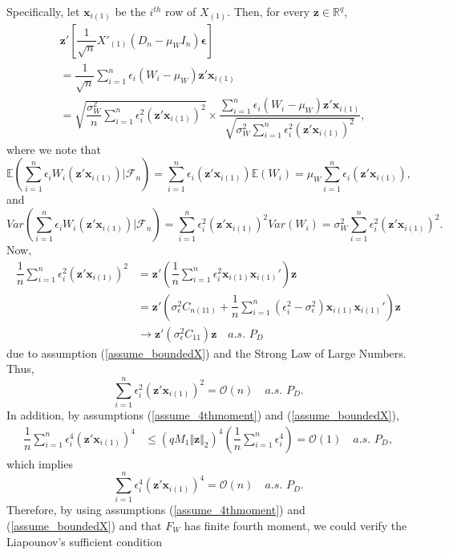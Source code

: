 \documentclass[ejs,authoryear,linksfromyear]{imsart}
\newcommand{\sumin}{\sum_{i=1}^n} %
\numberwithin{equation}{section}
\theoremstyle{plain}
\begin{document}
Specifically, let $\bm{x}_{i(1)}$ be the $i^{th}$ row of $X_{(1)}$. Then, for every $\bm{z} \in \mathbb{R}^q$,    
\begin{align*}
	&\bm{z}' \left[ \dfrac{1}{\sqrt{n}} X'_{(1)} (D_n - \mu_W I_n) \bm{\epsilon} \right] \\
	&= \dfrac{1}{\sqrt{n}} \sumin \epsilon_i (W_i - \mu_W) \bm{z}' \bm{x}_{i(1)} \\
	&= \sqrt{ \dfrac{\sigma_W^2}{n} \sumin \epsilon_i^2 \left( \bm{z}' \bm{x}_{i(1)} \right)^2 }
	\times \dfrac{ \sumin \epsilon_i (W_i - \mu_W) \bm{z}' \bm{x}_{i(1)} }
	{ \sqrt{ \sigma_W^2 \sumin \epsilon_i^2 \left( \bm{z}' \bm{x}_{i(1)} \right)^2 } },
\end{align*}
where we note that
	$$
	\mathbb{E}
	\left(
		\sumin \epsilon_i W_i (\bm{z}' \bm{x}_{i(1)}) 
		\bigg| \mathcal{F}_n
	\right)
	= \sumin \epsilon_i (\bm{z}' \bm{x}_{i(1)}) \mathbb{E} (W_i)
	= \mu_W \sumin \epsilon_i (\bm{z}' \bm{x}_{i(1)}), 
	$$
and
	$$
	Var
	\left(
		\sumin \epsilon_i W_i (\bm{z}' \bm{x}_{i(1)}) 
		\bigg| \mathcal{F}_n
	\right)
	= \sumin \epsilon_i^2 (\bm{z}' \bm{x}_{i(1)})^2 Var(W_i) 
	= \sigma^2_W \sumin \epsilon_i^2 (\bm{z}' \bm{x}_{i(1)})^2 .
	$$
Now,
\begin{align*}
\dfrac{1}{n} \sumin \epsilon_i^2 \left( \bm{z}' \bm{x}_{i(1)} \right)^2 
&=  \bm{z}' \left( \dfrac{1}{n}\sumin \epsilon_i^2 \bm{x}_{i(1)} \bm{x}_{i(1)}' \right) \bm{z} \\
&= \bm{z}' \left(
	\sigma^2_\epsilon C_{n(11)} +
	\dfrac{1}{n}\sumin \left( \epsilon_i^2 - \sigma^2_\epsilon \right) \bm{x}_{i(1)} \bm{x}_{i(1)}'
\right) \bm{z} \\
&\to \bm{z}' \left( \sigma^2_\epsilon C_{11} \right) \bm{z} 
\quad a.s. \,\, P_D
\end{align*}
due to assumption (\ref{assume_boundedX}) and the Strong Law of Large Numbers. Thus,
$$
\sumin \epsilon_i^2 \left( \bm{z}' \bm{x}_{i(1)} \right)^2 
= \mathcal{O}(n) \quad a.s. \,\, P_D. 
$$
In addition, by assumptions (\ref{assume_4thmoment}) and (\ref{assume_boundedX}),
\begin{align*}
\dfrac{1}{n} \sumin \epsilon_i^4 \left( \bm{z}' \bm{x}_{i(1)} \right)^4 
&\leq (q M_1 \Vert \bm{z} \Vert_2)^4 
\left( \dfrac{1}{n} \sumin \epsilon_i^4  \right)
= \mathcal{O}(1) \quad a.s. \,\, P_D,
\end{align*}
which implies
$$
\sumin \epsilon_i^4 \left( \bm{z}' \bm{x}_{i(1)} \right)^4
= \mathcal{O}(n) \quad a.s. \,\, P_D.
$$
Therefore, by using assumptions (\ref{assume_4thmoment}) and (\ref{assume_boundedX}) and that $F_W$ has finite fourth moment, we could verify the Liapounov's sufficient condition
\end{document}
